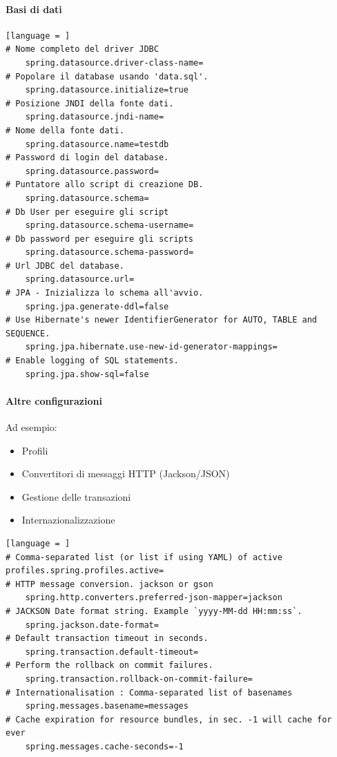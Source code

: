 \documentclass[11pt,a4paper]{book}
\begin{document}
\paragraph{Basi di dati}

\begin{lstlisting}[language = ]
# Nome completo del driver JDBC
	spring.datasource.driver-class-name=
# Popolare il database usando 'data.sql'.
	spring.datasource.initialize=true
# Posizione JNDI della fonte dati.
	spring.datasource.jndi-name=
# Nome della fonte dati.
	spring.datasource.name=testdb
# Password di login del database.
	spring.datasource.password=
# Puntatore allo script di creazione DB.
	spring.datasource.schema=
# Db User per eseguire gli script
	spring.datasource.schema-username=
# Db password per eseguire gli scripts
	spring.datasource.schema-password=
# Url JDBC del database.
	spring.datasource.url=
# JPA - Inizializza lo schema all'avvio.
	spring.jpa.generate-ddl=false
# Use Hibernate's newer IdentifierGenerator for AUTO, TABLE and SEQUENCE.
	spring.jpa.hibernate.use-new-id-generator-mappings=
# Enable logging of SQL statements.
	spring.jpa.show-sql=false
\end{lstlisting}

\paragraph{Altre configurazioni}
Ad esempio:
\begin{itemize}
	\item Profili
	\item Convertitori di messaggi HTTP (Jackson/JSON)
	\item Gestione delle transazioni
	\item Internazionalizzazione
\end{itemize}

\begin{lstlisting}[language = ]
# Comma-separated list (or list if using YAML) of active profiles.spring.profiles.active=
# HTTP message conversion. jackson or gson
	spring.http.converters.preferred-json-mapper=jackson
# JACKSON Date format string. Example `yyyy-MM-dd HH:mm:ss`.
	spring.jackson.date-format=
# Default transaction timeout in seconds.
	spring.transaction.default-timeout=
# Perform the rollback on commit failures.
	spring.transaction.rollback-on-commit-failure=
# Internationalisation : Comma-separated list of basenames
	spring.messages.basename=messages
# Cache expiration for resource bundles, in sec. -1 will cache for ever
	spring.messages.cache-seconds=-1
\end{lstlisting}
\end{document}
